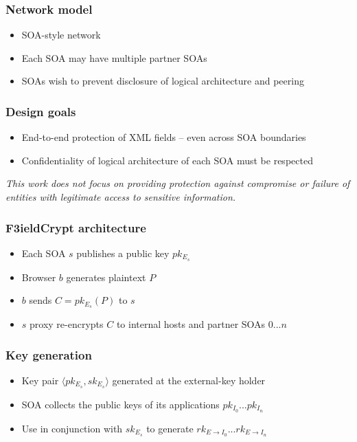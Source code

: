 \documentclass{beamer}
\begin{document}
\begin{frame}
\frametitle{Network model}
\begin{itemize}
\item SOA-style network
\item Each SOA may have multiple partner SOAs
\item SOAs wish to prevent disclosure of logical architecture and peering 
\end{itemize}
\end{frame}


\begin{frame}
\frametitle{Design goals}
\begin{itemize}
\item End-to-end protection of XML fields -- even across SOA boundaries
\item Confidentiality of logical architecture of each SOA must be respected
\end{itemize}
\medskip
\small{\emph{This work does not focus on providing protection against
compromise or failure of entities with legitimate access to sensitive
information.}}
\end{frame}

\begin{frame}
\frametitle{F3ieldCrypt architecture}
\begin{itemize}
\item Each SOA $s$ publishes a public key $pk_{E_s}$
\item Browser $b$ generates plaintext $P$
\item $b$ sends $C = pk_{E_s}(P)$ to $s$
\item $s$ proxy re-encrypts $C$ to internal hosts and partner SOAs $0...n$ 
\end{itemize}
\end{frame}

\begin{frame}
\frametitle{Key generation}
\begin{itemize}
\item Key pair $\langle pk_{E_s}, sk_{E_s} \rangle$ generated at the
\alert{external-key holder}
\item SOA collects the public keys of its applications $pk_{I_0}...pk_{I_n}$
\item Use in conjunction with $sk_{E_s}$ to generate $rk_{E \to I_0}...rk_{E
\to I_n}$
\end{itemize}
\end{frame}
\end{document}
